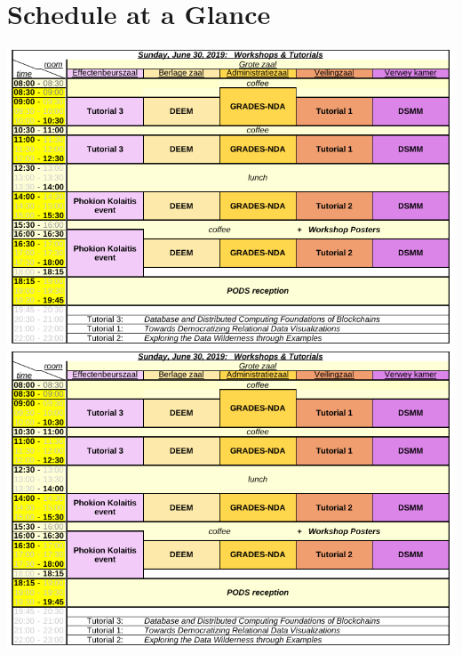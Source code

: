 

~\cleardoublepage

\section{Schedule at a Glance}


\ifodd\value{page}
\includegraphics[height=\textwidth,width=.97\textheight,angle=90]{schedule/p1.pdf}%
\else
\includegraphics[height=\textwidth,width=.97\textheight,angle=270]{schedule/p1.pdf}%
\fi

